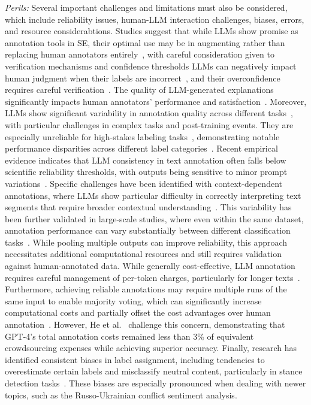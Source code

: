 \documentclass[11pt]{article}
\begin{document}
\emph{Perils:} Several important challenges and limitations must also be considered, which include reliability issues, human-LLM interaction challenges, biases, errors, and resource considerabtions.
Studies suggest that while LLMs show promise as annotation tools in SE, their optimal use may be in augmenting rather than replacing human annotators entirely~\cite{DBLP:conf/emnlp/WangLXZZ21, DBLP:conf/chi/HeHDRH24}, with careful consideration given to verification mechanisms and confidence thresholds
LLMs can negatively impact human judgment when their labels are incorrect~\cite{DBLP:conf/www/HuangKA23a}, and their overconfidence requires careful verification~\cite{DBLP:conf/kdd/WanSJKCNSSWYABJ24}. The quality of LLM-generated explanations significantly impacts human annotators' performance and satisfaction~\cite{DBLP:conf/chi/Wang0RMM24}.
Moreover, LLMs show significant variability in annotation quality across different tasks~\cite{DBLP:conf/www/HuangKA23a,DBLP:conf/chi/Wang0RMM24}, with particular challenges in complex tasks and post-training events. They are especially unreliable for high-stakes labeling tasks~\cite{DBLP:conf/chi/Wang0RMM24}, demonstrating notable performance disparities across different label categories~\cite{DBLP:journals/corr/abs-2304-10145}. Recent empirical evidence indicates that LLM consistency in text annotation often falls below scientific reliability thresholds, with outputs being sensitive to minor prompt variations~\cite{DBLP:journals/corr/abs-2304-11085}. Specific challenges have been identified with context-dependent annotations, where LLMs show particular difficulty in correctly interpreting text segments that require broader contextual understanding~\cite{DBLP:conf/chi/HeHDRH24}. This variability has been further validated in large-scale studies, where even within the same dataset, annotation performance can vary substantially between different classification tasks~\cite{DBLP:journals/corr/abs-2306-00176}. While pooling multiple outputs can improve reliability, this approach necessitates additional computational resources and still requires validation against human-annotated data.
While generally cost-effective, LLM annotation requires careful management of per-token charges, particularly for longer texts~\cite{DBLP:conf/emnlp/WangLXZZ21}. Furthermore, achieving reliable annotations may require multiple runs of the same input to enable majority voting, which can significantly increase computational costs and partially offset the cost advantages over human annotation~\cite{DBLP:journals/corr/abs-2304-11085}. However, He et al.~\cite{DBLP:conf/chi/HeHDRH24} challenge this concern, demonstrating that GPT-4's total annotation costs remained less than 3\% of equivalent crowdsourcing expenses while achieving superior accuracy.
Finally, research has identified consistent biases in label assignment, including tendencies to overestimate certain labels and misclassify neutral content, particularly in stance detection tasks~\cite{DBLP:journals/corr/abs-2304-10145}. These biases are especially pronounced when dealing with newer topics, such as the Russo-Ukrainian conflict sentiment analysis.
\end{document}
